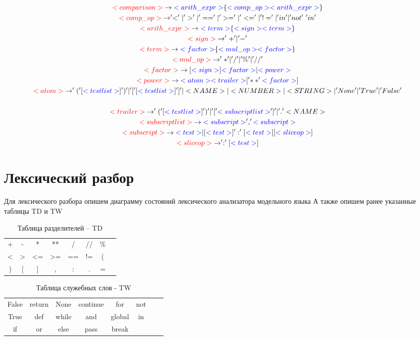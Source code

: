 \documentclass[russian,a4paper]{article}
\newcommand{\ns}[1]{\textcolor{blue}{<#1>}}
\newcommand{\ls}[1]{\textcolor{red}{<#1>}}
\newcommand{\ts}[1]{<#1>}
\begin{document}
{\begin{gather*}
	\ls{comparison} \to \ns{arith\_expr} \{\ns{comp\_op} \ns{arith\_expr}\}\\ 
	\ls{comp\_op} \to '<'|'>'|'=='|'>='|'<='|'!='|'in'|'not'\ 'in'\\ 
	\ls{arith\_expr} \to \ns{term} \{\ns{sign} \ns{term}\}\\ 
	\ls{sign} \to '+'|'-'\\ 
	\ls{term} \to \ns{factor} \{\ns{mul\_op} \ns{factor}\}\\ 
	\ls{mul\_op} \to '*'|'/'|'\%'|'//'\\ 
	\ls{factor} \to [\ns{sign}] \ns{factor} | \ns{power}\\ 
	\ls{power} \to \ns{atom} {\ns{trailer}} ['**' \ns{factor}]\\ 
	\ls{atom} \to'(' [\ns{testlist}] ')' | '[' [\ns{testlist}] ']' | \ts{NAME} | \ts{NUMBER} | \ts{STRING} | 'None' | 'True' | 'False'\\ 
	\\
	\ls{trailer} \to '(' [\ns{testlist}] ')' | '[' \ns{subscriptlist} ']' | '.' \ts{NAME}\\ 
	\ls{subscriptlist} \to \ns{subscript} {',' \ns{subscript}}\\ 
	\ls{subscript} \to \ns{test} | [\ns{test}] ':' [\ns{test}] [\ns{sliceop}]\\ 
	\ls{sliceop} \to ':' [\ns{test}]
\end{gather*}
}

\section{Лексический разбор}

Для лексического разбора опишем диаграмму состояний лексического анализатора модельного языка
А также опишем ранее указанные таблицы TD и TW\\
\begin{table}[h]
\caption{Таблица разделителей -- TD} %
\centering %
\begin{tabular}{cccccccc} %
\hline\hline %
+&  -&   *&       **&      /& //& \% \\
<& >& <=& >=&  ==& !=& (&\\
)&       [&       ]&     ,&       :&  .& =&\\[1ex]
\hline %
\end{tabular}
\label{tab:hresult}
\end{table}

\begin{table}[h]
\caption{Таблица служебных слов - TW} %
\centering %
\begin{tabular}{cccccccc} %
\hline\hline %
False&      return&     None& continue& for&  not&\\
True&       def& while& and &       global&  in&\\
if&         or&   else&       pass&       break &    \\ [1ex]
\hline %
\end{tabular}
\label{tab:hresult}
\end{table}
\end{document}
